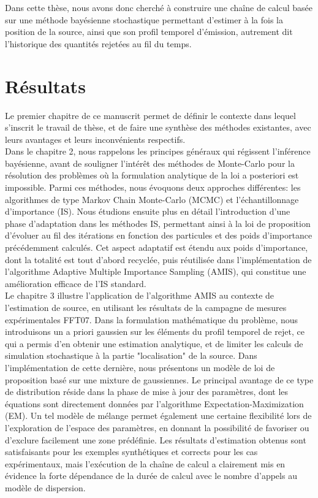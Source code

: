 Dans cette thèse, nous avons donc cherché à construire une chaîne de calcul  basée sur une méthode bayésienne stochastique permettant d'estimer à la fois la position de la source, ainsi que son profil temporel d'émission, autrement dit l'historique des quantités rejetées au fil du temps.

\section{Résultats}

Le premier chapitre de ce manuscrit permet de définir le contexte dans lequel s'inscrit le travail de thèse, et de faire une synthèse des méthodes existantes, avec leurs avantages et leurs inconvénients respectifs.\\


Dans le chapitre 2, nous rappelons les principes généraux qui régissent l'inférence bayésienne, avant de souligner l'intérêt des méthodes de Monte-Carlo pour la résolution des problèmes où la formulation analytique de la loi a posteriori est impossible. Parmi ces méthodes, nous évoquons deux approches différentes: les algorithmes de type Markov Chain Monte-Carlo (MCMC) et l'échantillonnage d'importance (IS). Nous étudions ensuite plus en détail l'introduction d'une phase d'adaptation dans les méthodes IS, permettant ainsi à la loi de proposition d'évoluer au fil des itérations en fonction des particules et des poids d'importance précédemment calculés. Cet aspect adaptatif est étendu aux poids d'importance, dont la totalité est tout d'abord recyclée, puis réutilisée dans l'implémentation de l'algorithme Adaptive Multiple Importance Sampling (AMIS), qui constitue une amélioration efficace de l'IS standard. \\

Le chapitre 3 illustre l'application de l'algorithme AMIS au contexte de l'estimation de source, en utilisant les résultats de la campagne de mesures expérimentales FFT07. Dans la formulation mathématique du problème, nous introduisons un a priori gaussien sur les éléments du profil temporel de rejet, ce qui a permis d'en obtenir une estimation analytique, et de limiter les calculs de simulation stochastique à la partie "localisation" de la source. Dans l'implémentation de cette dernière, nous présentons un modèle de loi de proposition basé sur une mixture de gaussiennes. Le principal avantage de ce type de distribution réside dans la phase de mise à jour des paramètres, dont les équations sont directement données par l'algorithme Expectation-Maximization (EM). Un tel modèle de mélange permet également une certaine flexibilité lors de l'exploration de l'espace des paramètres, en donnant la possibilité de favoriser ou d'exclure facilement une zone prédéfinie. Les résultats d'estimation obtenus sont satisfaisants pour les exemples synthétiques et corrects pour les cas expérimentaux, mais l'exécution de la chaîne de calcul a clairement mis en évidence la forte dépendance de la durée de calcul avec le nombre d'appels au modèle de dispersion. \\


